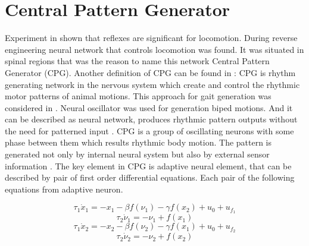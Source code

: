 \documentclass[12pt,a4paper]{report}
\begin{document}
	\section{Central Pattern Generator}

		Experiment in \cite{grillner1975locomotion} shown that reflexes are significant for locomotion. During reverse engineering neural network that controls locomotion was found. It was situated in spinal regions that was the reason to name this network Central Pattern Generator (CPG).
		Another definition of CPG can be found in \cite{lee2007construction}: CPG is rhythm generating network in the nervous system which create and control the rhythmic motor patterns of animal motions. This approach for gait generation was considered in \cite{miyakoshi1998three}. Neural oscillator was used for generation biped motions. And it can be described as neural network, produces rhythmic pattern outputs without the need for patterned input \cite{wright2014intelligent}. CPG is a group of oscillating neurons with some phase between them which results rhythmic body motion. The pattern is generated not only by internal neural system but also by external sensor information \cite{miyakoshi1998three}. The key element in CPG is adaptive neural element, that can be described by pair of first order differential equations. Each pair of the following equations from adaptive neuron.

		\begin{equation}\label{eq:CPG1}
			\tau_1 \dot{x}_1 = -x_1 - \beta f(\nu_1) -  \gamma f(x_2) + u_0 + u_{f_1}
		\end{equation}
		\begin{equation}\label{eq:CPG2}
			\tau_2 \dot{\nu}_1 = -\nu_1  + f(x_1)
		\end{equation}
		\begin{equation}\label{eq:CPG3}
			\tau_1 \dot{x}_2 = -x_2 - \beta f(\nu_2) -  \gamma f(x_1) + u_0 + u_{f_2}
		\end{equation}
		\begin{equation}\label{eq:CPG4}
			\tau_2 \dot{\nu}_2 = -\nu_2  + f(x_2)
		\end{equation}
\end{document}
